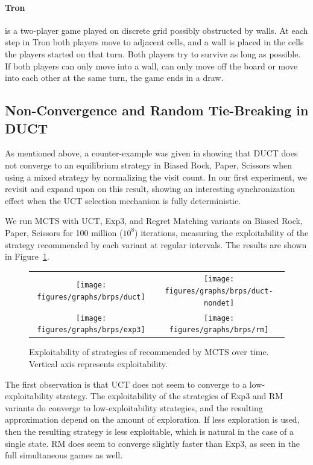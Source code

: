 \paragraph{\textbf{Tron}} is a two-player game played on discrete grid possibly obstructed by walls. At each
step in Tron both players move to adjacent cells, and a wall is placed in the cells the players started on that turn.
Both players try to survive as long as possible. If both players can only move into a wall, can only move off the board or move into each other at the same turn, the game ends  in a draw. 

\subsection{Non-Convergence and Random Tie-Breaking in DUCT}\label{sec:exp:brps} 

As mentioned above, a counter-example was given in \cite{Shafiei09} showing that 
DUCT does not converge to an equilibrium strategy in Biased Rock, Paper, Scissors 
when using a mixed strategy by normalizing the visit count.
In our first experiment, we revisit and expand upon on this result, showing an interesting 
synchronization effect when the UCT selection mechanism is fully deterministic.

We run MCTS with UCT, Exp3, and Regret Matching variants on Biased Rock, Paper, Scissors
for 100 million ($10^8$) iterations, measuring the exploitability of the strategy recommended by 
each variant at regular intervals. The results are shown in Figure~\ref{fig:expl-brps}.

\begin{figure}[t]
\begin{tabular}{cc}
\hspace{-1cm} \texttt{[image: figures/graphs/brps/duct]} & \texttt{[image: figures/graphs/brps/duct-nondet]}\\
\hspace{-1cm} \texttt{[image: figures/graphs/brps/exp3]} & \texttt{[image: figures/graphs/brps/rm]}\\
\end{tabular}
\caption{Exploitability of strategies of recommended by MCTS over time. Vertical axis represents exploitability. \label{fig:expl-brps}}
\end{figure}

The first observation is that UCT does not seem to converge to a low-exploitability strategy. The exploitability of the strategies of 
Exp3 and RM variants do converge to low-exploitability strategies, and the resulting approximation depend on the amount of exploration. 
If less exploration is used, then the resulting strategy is less exploitable, which is natural in the case of a single state. RM does seem to 
converge slightly faster than Exp3, as seen in the full simultaneous games as well. 

